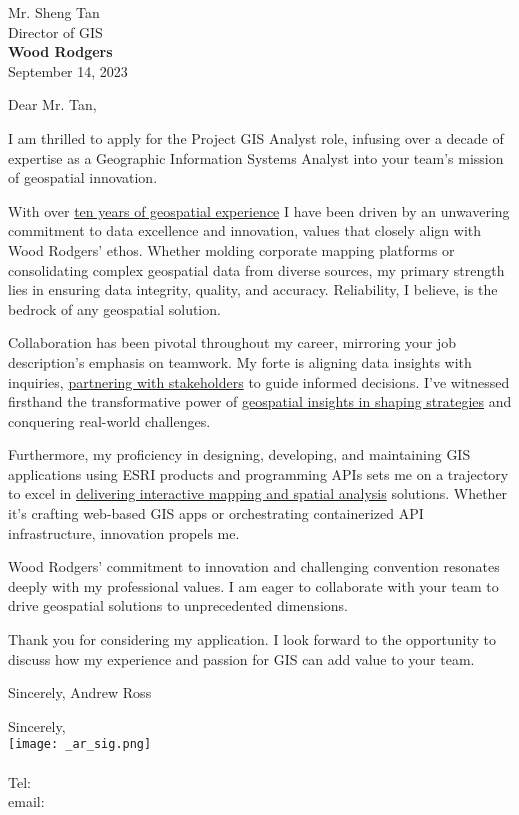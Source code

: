 \documentclass[letterpaper]{article}
\newcommand{\impt}[1]{\uline{#1}}
\begin{document}
\large

Mr. Sheng Tan \\
Director of GIS \\
\textbf{Wood Rodgers} \\

\null\hfill September 14, 2023
\vspace{1em}

Dear Mr. Tan,

I am thrilled to apply for the Project GIS Analyst role, infusing over a decade
of expertise as a Geographic Information Systems Analyst into your team's
mission of geospatial innovation.

With over \impt{ten years of geospatial experience} I have been driven by an unwavering
commitment to data excellence and innovation, values that closely align with
Wood Rodgers' ethos. Whether molding corporate mapping platforms or consolidating
complex geospatial data from diverse sources, my primary strength lies in
ensuring data integrity, quality, and accuracy. Reliability, I believe, is the
bedrock of any geospatial solution.

Collaboration has been pivotal throughout my career, mirroring your job
description's emphasis on teamwork. My forte is aligning data insights with
inquiries, \impt{partnering with stakeholders} to guide informed decisions. I've
witnessed firsthand the transformative power of \impt{geospatial insights in shaping
strategies} and conquering real-world challenges.

Furthermore, my proficiency in designing, developing, and maintaining GIS
applications using ESRI products and programming APIs
sets me on a trajectory to excel in \impt{delivering interactive mapping
and spatial analysis} solutions. Whether it's crafting web-based GIS apps or
orchestrating containerized API infrastructure, innovation propels me.

Wood Rodgers' commitment to innovation and challenging convention resonates
deeply with my professional values. I am eager to collaborate with your team to
drive geospatial solutions to unprecedented dimensions.

Thank you for considering my application. I look forward to the opportunity to
discuss how my experience and passion for GIS can add value to your team.

Sincerely,
Andrew Ross

Sincerely,\\
    \hspace{1em}
    \texttt{[image: \_ar\_sig.png]} \\
    \CVsigname \\
    \small
    Tel: \CVphone \\
    email: \CVemail
\end{document}
